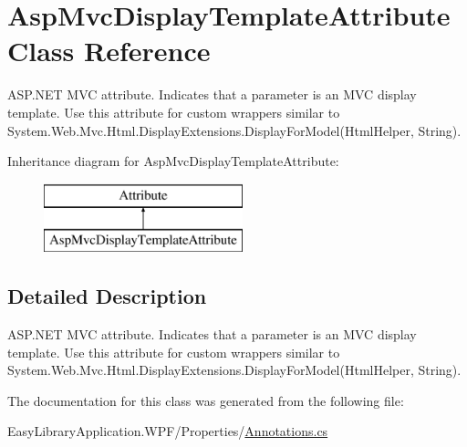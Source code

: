 \hypertarget{class_asp_mvc_display_template_attribute}{}\section{Asp\+Mvc\+Display\+Template\+Attribute Class Reference}
\label{class_asp_mvc_display_template_attribute}


A\+S\+P.\+N\+ET M\+VC attribute. Indicates that a parameter is an M\+VC display template. Use this attribute for custom wrappers similar to {\ttfamily System.\+Web.\+Mvc.\+Html.\+Display\+Extensions.\+Display\+For\+Model(\+Html\+Helper, String)}.  


Inheritance diagram for Asp\+Mvc\+Display\+Template\+Attribute\+:\begin{figure}[H]
\begin{center}
\leavevmode
\includegraphics[height=2.000000cm]{class_asp_mvc_display_template_attribute}
\end{center}
\end{figure}


\subsection{Detailed Description}
A\+S\+P.\+N\+ET M\+VC attribute. Indicates that a parameter is an M\+VC display template. Use this attribute for custom wrappers similar to {\ttfamily System.\+Web.\+Mvc.\+Html.\+Display\+Extensions.\+Display\+For\+Model(\+Html\+Helper, String)}. 



The documentation for this class was generated from the following file\+:\begin{DoxyCompactItemize}
\item 
Easy\+Library\+Application.\+W\+P\+F/\+Properties/\mbox{\hyperlink{_annotations_8cs}{Annotations.\+cs}}\end{DoxyCompactItemize}
